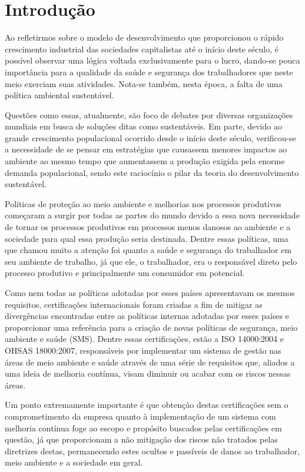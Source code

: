 \documentclass[../main.tex]{subfiles}
\begin{document}
\chapter{Introdução}

Ao refletirmos sobre o modelo de desenvolvimento que proporcionou o rápido crescimento industrial das sociedades capitalistas até o início deste século, é possível observar uma lógica voltada exclusivamente para o lucro, dando-se pouca importância para a qualidade da saúde e segurança dos trabalhadores que neste meio exerciam suas atividades. Nota-se também, nesta época, a falta de uma política ambiental sustentável.

Questões como essas, atualmente, são foco de debates por diversas organizações mundiais em busca de soluções ditas como sustentáveis. Em parte, devido ao grande crescimento populacional ocorrido desde o início deste século, verificou-se a necessidade de se pensar em estratégias que causassem menores impactos ao ambiente ao mesmo tempo que aumentassem a produção exigida pela enorme demanda populacional, sendo este raciocínio o pilar da teoria do desenvolvimento sustentável.

Políticas de proteção ao meio ambiente e melhorias nos processos produtivos começaram a surgir por todas as partes do mundo devido a essa nova necessidade de tornar os processos produtivos em processos menos danosos ao ambiente e a sociedade para qual essa produção seria destinada. Dentre essas políticas, uma que chamou muito a atenção foi quanto a saúde e segurança do trabalhador em seu ambiente de trabalho, já que ele, o trabalhador, era o responsável direto pelo processo produtivo e principalmente um consumidor em potencial.

Como nem todas as políticas adotadas por esses países apresentavam os mesmos requisitos, certificações internacionais foram criadas a fim de mitigar as divergências encontradas entre as políticas internas adotadas por esses países e proporcionar uma referência para a criação de novas políticas de segurança, meio ambiente e saúde (SMS). Dentre essas certificações, estão a ISO 14000:2004 e OHSAS 18000:2007, responsáveis por implementar um sistema de gestão nas áreas de meio ambiente e saúde através de uma série de requisitos que, aliados a uma ideia de melhoria contínua, visam diminuir ou acabar com os riscos nessas áreas.

Um ponto extremamente importante é que obtenção destas certificações sem o comprometimento da empresa quanto à implementação de um sistema com melhoria contínua foge ao escopo e propósito buscados pelas certificações em questão, já que proporcionam a não mitigação dos riscos não tratados pelas diretrizes destas, permanecendo estes ocultos e passíveis de danos ao trabalhador, meio ambiente e a sociedade em geral.
\end{document}
